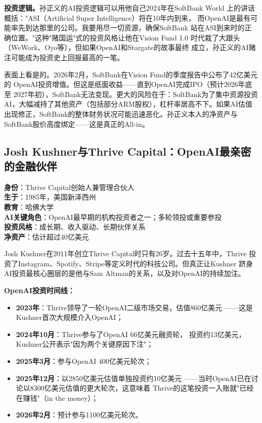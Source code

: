 \textbf{投资逻辑。}孙正义的AI投资逻辑可以用他自己2024年在SoftBank World
上的讲话概括："ASI（Artificial Super Intelligence）将在10年内到来，
而OpenAI是最有可能率先到达那里的公司。我要用尽一切资源，确保SoftBank
站在ASI到来时的正确位置。"这种"赌国运"式的投资风格让他在Vision Fund 1.0
时代栽了大跟头（WeWork、Oyo等），但如果OpenAI和Stargate的故事最终
成立，孙正义的AI赌注可能成为投资史上回报最高的一笔。

\begin{warnbox}[SoftBank的OpenAI投资已经赚钱了吗？]
表面上看是的。2026年2月，SoftBank在Vision Fund的季度报告中公布了42亿美元的
OpenAI投资增值。但这是纸面收益——直到OpenAI完成IPO（预计2026年底至
2027年初），SoftBank无法变现。更大的风险在于：SoftBank为了集中资源投资
AI，大幅减持了其他资产（包括部分ARM股权），杠杆率居高不下。如果AI估值
出现修正，SoftBank的整体财务状况可能迅速恶化。孙正义本人的净资产与
SoftBank股价高度绑定——这是真正的All-in。
\end{warnbox}


\subsection{Josh Kushner与Thrive Capital：OpenAI最亲密的金融伙伴}
\label{subsec:inv-thrive}

\begin{corebox}
\textbf{身份}：Thrive Capital创始人兼管理合伙人 \\
\textbf{生于}：1985年，美国新泽西州 \\
\textbf{教育}：哈佛大学 \\
\textbf{AI关键角色}：OpenAI最早期的机构投资者之一；多轮领投或重要参投 \\
\textbf{投资风格}：成长期、收入驱动、长期伙伴关系 \\
\textbf{净资产}：估计超过40亿美元
\end{corebox}

Josh Kushner在2011年创立Thrive Capital时只有26岁。过去十五年中，Thrive
投资了Instagram、Spotify、Stripe等定义时代的科技公司。但真正让Kushner
跻身AI投资最核心圈层的是他与Sam Altman的关系，以及对OpenAI的持续加注。

\textbf{OpenAI投资时间线：}
\begin{itemize}
  \item \textbf{2023年}：Thrive领导了一轮OpenAI二级市场交易，估值860亿美元
    ——这是Kushner首次大规模介入OpenAI；
  \item \textbf{2024年10月}：Thrive参与了OpenAI 66亿美元融资轮，
    投资约13亿美元，Kushner公开表示"因为两个关键原因下注"；
  \item \textbf{2025年3月}：参与OpenAI 400亿美元轮次；
  \item \textbf{2025年12月}：以2850亿美元估值单独投资约10亿美元
    ——当时OpenAI已在讨论以8300亿美元估值的更大轮次，这意味着
    Thrive的这笔投资一入账就"已经在赚钱"（in the money）；
  \item \textbf{2026年2月}：预计参与1100亿美元轮次。
\end{itemize}

